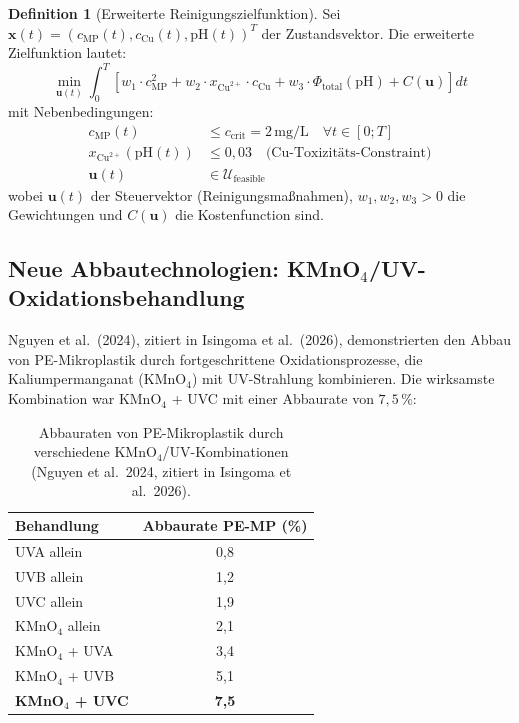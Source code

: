 ﻿\documentclass[12pt,a4paper]{article}
\theoremstyle{definition}
\newtheorem{definition}{Definition}[section]
\theoremstyle{remark}
\begin{document}
\begin{definition}[Erweiterte Reinigungszielfunktion]
Sei $\mathbf{x}(t) = (c_{\text{MP}}(t), c_{\text{Cu}}(t), \text{pH}(t))^T$
der Zustandsvektor. Die erweiterte Zielfunktion lautet:
\begin{equation}
  \min_{\mathbf{u}(t)} \int_0^T \left[
    w_1 \cdot c_{\text{MP}}^2 +
    w_2 \cdot x_{\text{Cu}^{2+}} \cdot c_{\text{Cu}} +
    w_3 \cdot \Phi_{\text{total}}(\text{pH}) +
    C(\mathbf{u})
  \right] dt
  \label{eq:extended_objective}
\end{equation}
mit Nebenbedingungen:
\begin{align}
  c_{\text{MP}}(t) &\leq c_{\text{crit}} = 2\,\text{mg/L}
    \quad \forall t \in [0; T] \label{eq:constraint1}\\
  x_{\text{Cu}^{2+}}(\text{pH}(t)) &\leq 0{,}03
    \quad \text{(Cu-Toxizit\"ats-Constraint)} \label{eq:constraint2}\\
  \mathbf{u}(t) &\in \mathcal{U}_{\text{feasible}} \label{eq:constraint3}
\end{align}
wobei $\mathbf{u}(t)$ der Steuervektor (Reinigungsma\ss{}nahmen),
$w_1, w_2, w_3 > 0$ die Gewichtungen und $C(\mathbf{u})$ die Kostenfunction sind.
\end{definition}

\subsection{Neue Abbautechnologien: KMnO$_4$/UV-Oxidationsbehandlung}
\label{subsec:kmno4_uv}

Nguyen et al.\ (2024), zitiert in Isingoma et al.\ (2026), demonstrierten den
Abbau von PE-Mikroplastik durch fortgeschrittene Oxidationsprozesse, die
Kaliumpermanganat (KMnO$_4$) mit UV-Strahlung kombinieren. Die wirksamste
Kombination war KMnO$_4$ + UVC mit einer Abbaurate von $7{,}5\,\%$:

\begin{table}[H]
  \centering
  \caption{Abbauraten von PE-Mikroplastik durch verschiedene KMnO$_4$/UV-Kombinationen
           (Nguyen et al.\ 2024, zitiert in Isingoma et al.\ 2026).}
  \label{tab:kmno4_uv}
  \begin{tabular}{lc}
    \toprule
    Behandlung & Abbaurate PE-MP (\%) \\
    \midrule
    UVA allein                    & 0{,}8 \\
    UVB allein                    & 1{,}2 \\
    UVC allein                    & 1{,}9 \\
    KMnO$_4$ allein               & 2{,}1 \\
    KMnO$_4$ + UVA                & 3{,}4 \\
    KMnO$_4$ + UVB                & 5{,}1 \\
    \textbf{KMnO$_4$ + UVC}      & \textbf{7{,}5} \\
    \bottomrule
  \end{tabular}
\end{table}
\end{document}
